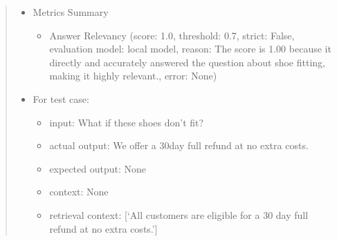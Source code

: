 \documentclass[letterpaper,11pt,english]{sphinxmanual}
\begin{document}
\begin{itemize}
\begin{itemize}
\begin{quote}
\begin{sphinxVerbatim}[commandchars=\\\{\}]
  
  
    \PYG{p}{[}\PYG{p}{]}
\PYG{p}{[}\PYG{p}{]} \PYG{p}{[}\PYG{p}{]}
\end{sphinxVerbatim}
\begin{itemize}
\item {} 
\sphinxAtStartPar
Metrics Summary
\begin{itemize}
\item {} 
\sphinxAtStartPar
Answer Relevancy (score: 1.0, threshold: 0.7, strict: False, evaluation model: local model,
reason: The score is 1.00 because it directly and accurately answered the question about
shoe fitting, making it highly relevant., error: None)

\end{itemize}

\item {} 
\sphinxAtStartPar
For test case:
\begin{itemize}
\item {} 
\sphinxAtStartPar
input: What if these shoes don’t fit?

\item {} 
\sphinxAtStartPar
actual output: We offer a 30\sphinxhyphen{}day full refund at no extra costs.

\item {} 
\sphinxAtStartPar
expected output: None

\item {} 
\sphinxAtStartPar
context: None

\item {} 
\sphinxAtStartPar
retrieval context: {[}‘All customers are eligible for a 30 day full refund at no extra costs.’{]}


\end{itemize}
\end{itemize}
\end{quote}
\end{itemize}
\end{itemize}
\end{document}
